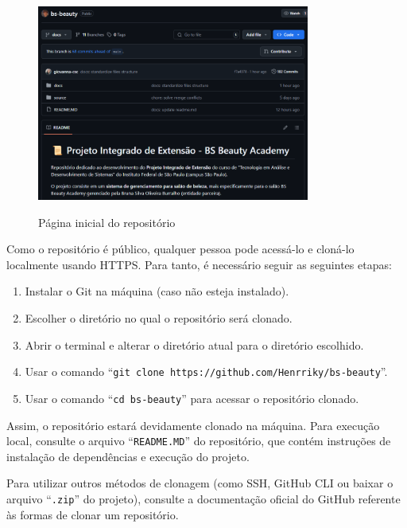 \begin{figure}[h]
	\centering
	\caption{Página inicial do repositório}
	\includegraphics[width=0.8\textwidth]{cap03-gestao/imagens/bsbeauty-repositorio.png}
	\label{fig:inicio-repositorio}
\end{figure}

Como o repositório é público, qualquer pessoa pode acessá-lo e cloná-lo localmente usando HTTPS. Para tanto, é necessário seguir as seguintes etapas:
 
\begin{enumerate}
	\item Instalar o Git na máquina (caso não esteja instalado).
	\item Escolher o diretório no qual o repositório será clonado.
	\item Abrir o terminal e alterar o diretório atual para o diretório escolhido.
	\item Usar o comando ``\texttt{git clone https://github.com/Henrriky/bs-beauty}''.
	\item Usar o comando ``\texttt{cd bs-beauty}'' para acessar o repositório clonado.
\end{enumerate}

Assim, o repositório estará devidamente clonado na máquina. Para execução local, consulte o arquivo ``\texttt{README.MD}'' do repositório, que contém instruções de instalação de dependências e execução do projeto.

Para utilizar outros métodos de clonagem (como SSH, GitHub CLI ou baixar o arquivo ``\texttt{.zip}'' do projeto), consulte a documentação oficial do GitHub \cite{GitHubClonagem} referente às formas de clonar um repositório.